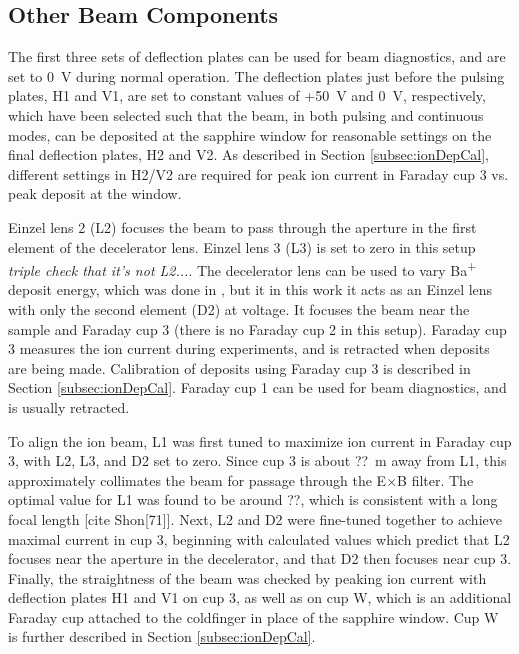 \subsection{Other Beam Components}

The first three sets of deflection plates can be used for beam diagnostics, and are set to 0~V during normal operation.  The deflection plates just before the pulsing plates, H1 and V1, are set to constant values of +50~V and 0~V, respectively, which have been selected such that the beam, in both pulsing and continuous modes, can be deposited at the sapphire window for reasonable settings on the final deflection plates, H2 and V2.  As described in Section \ref{subsec:ionDepCal}, different settings in H2/V2 are required for peak ion current in Faraday cup 3 vs. peak deposit at the window.

Einzel lens 2 (L2) focuses the beam to pass through the aperture in the first element of the decelerator lens.  Einzel lens 3 (L3) is set to zero in this setup \emph{\color{gray}triple check that it's not L2...}.  The decelerator lens can be used to vary Ba\textsuperscript{+} deposit energy, which was done in \cite{Shon}, but it in this work it acts as an Einzel lens with only the second element (D2) at voltage.  It focuses the beam near the sample and Faraday cup 3 (there is no Faraday cup 2 in this setup).  Faraday cup 3 measures the ion current during experiments, and is retracted when deposits are being made.  Calibration of deposits using Faraday cup 3 is described in Section \ref{subsec:ionDepCal}.  Faraday cup 1 can be used for beam diagnostics, and is usually retracted.  

To align the ion beam, L1 was first tuned to maximize ion current in Faraday cup 3, with L2, L3, and D2 set to zero.  Since cup 3 is about {\color{red}??}~m away from L1, this approximately collimates the beam for passage through the E$\times$B filter.  The optimal value for L1 was found to be around {\color{red}??}, which is consistent with a long focal length [cite Shon[71]].  Next, L2 and D2 were fine-tuned together to achieve maximal current in cup 3, beginning with calculated values which predict that L2 focuses near the aperture in the decelerator, and that D2 then focuses near cup 3.  Finally, the straightness of the beam was checked by peaking ion current with deflection plates H1 and V1 on cup 3, as well as on cup W, which is an additional Faraday cup attached to the coldfinger in place of the sapphire window.  Cup W is further described in Section \ref{subsec:ionDepCal}.

